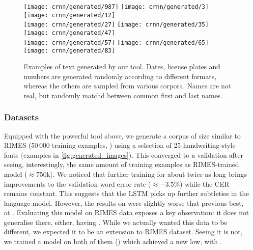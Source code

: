 			\begin{figure}
				\texttt{[image: crnn/generated/987]}\hspace{3mm}
				\texttt{[image: crnn/generated/3]}\hspace{3mm}
				\texttt{[image: crnn/generated/12]}\\\vspace{3mm}
				\texttt{[image: crnn/generated/27]}\hspace{3mm}
				\texttt{[image: crnn/generated/35]}\hspace{3mm}
				\texttt{[image: crnn/generated/47]}\\\vspace{3mm}
				\texttt{[image: crnn/generated/57]}\hspace{3mm}
				\texttt{[image: crnn/generated/65]}\hspace{3mm}
				\texttt{[image: crnn/generated/83]}
				\caption[Generated images]{Examples of text generated by our tool. Dates, license plates and numbers are generated randomly according to different formats, whereas the others are sampled from various corpora. Names are not real, but randomly matchd between common first and last names.}
				\label{fig:generated_images}
			\end{figure}

		\subsubsection*{Datasets}
			Equipped with the powerful tool above, we generate a corpus of size similar to RIMES (50\,000 training examples, ) using a selection of 25 handwriting-style fonts (examples in \autoref{fig:generated_images}). This converged to a validation  after seeing, interestingly, the same amount of training examples as RIMES-trained model (\(\approx 750\)k). We noticed that further training for about twice as long brings improvements to the validation word error rate (\(\approx -3.5\%\)) while the CER remains constant. This suggests that the LSTM picks up further subtleties in the language model. However, the results on  were slightly worse that previous best, at . Evaluating this model on RIMES data exposes a key observation: it does not generalise there, either, having . While we actually wanted this data to be different, we expected it to be an extension to RIMES dataset. Seeing it is not, we trained a model on both of them () which achieved a new low, with .

